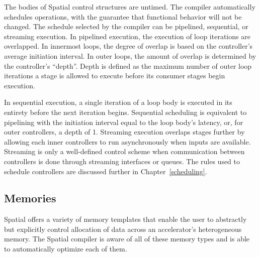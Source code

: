 The bodies of Spatial control structures are untimed. The compiler automatically schedules operations, with the guarantee that functional behavior will not be changed.
The schedule selected by the compiler can be pipelined, sequential, or streaming execution. In pipelined execution, the execution of loop iterations are overlapped.
In innermost loops, the degree of overlap is based on the controller's average initiation interval.
In outer loops, the amount of overlap is determined by the controller's ``depth''. Depth is defined as the maximum number of outer loop iterations a stage is allowed to execute before its consumer stages begin execution.

In sequential execution, a single iteration of a loop body is executed in its entirety before the next iteration begins.
Sequential scheduling is equivalent to pipelining with the initiation interval equal to the loop body's latency, or, for outer controllers, a depth of 1. Streaming execution overlaps stages further by allowing each inner controllers to run asynchronously when inputs are available.
Streaming is only a well-defined control scheme when communication between controllers is done through streaming interfaces or queues.
The rules used to schedule controllers are discussed further in Chapter~\ref{scheduling}.




\subsection{Memories}

Spatial offers a variety of memory templates that enable the user to abstractly but explicitly control allocation of data across an accelerator's heterogeneous memory.
The Spatial compiler is aware of all of these memory types and is able to automatically optimize each of them.

